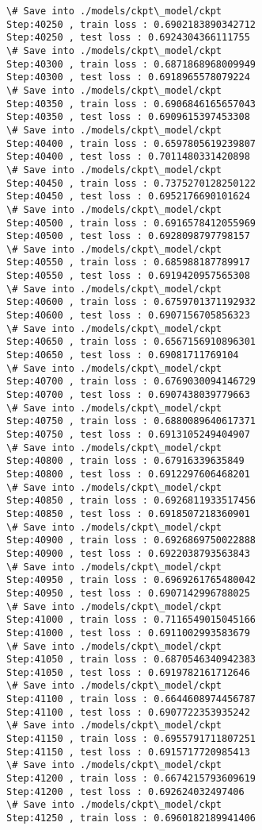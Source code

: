 \documentclass[11pt]{article}
\begin{document}
\begin{Verbatim}[commandchars=\\\{\}]
\# Save into ./models/ckpt\_model/ckpt
Step:40250 , train loss : 0.6902183890342712
Step:40250 , test loss : 0.6924304366111755
\# Save into ./models/ckpt\_model/ckpt
Step:40300 , train loss : 0.6871868968009949
Step:40300 , test loss : 0.6918965578079224
\# Save into ./models/ckpt\_model/ckpt
Step:40350 , train loss : 0.6906846165657043
Step:40350 , test loss : 0.6909615397453308
\# Save into ./models/ckpt\_model/ckpt
Step:40400 , train loss : 0.6597805619239807
Step:40400 , test loss : 0.7011480331420898
\# Save into ./models/ckpt\_model/ckpt
Step:40450 , train loss : 0.7375270128250122
Step:40450 , test loss : 0.6952176690101624
\# Save into ./models/ckpt\_model/ckpt
Step:40500 , train loss : 0.6916578412055969
Step:40500 , test loss : 0.6928098797798157
\# Save into ./models/ckpt\_model/ckpt
Step:40550 , train loss : 0.685988187789917
Step:40550 , test loss : 0.6919420957565308
\# Save into ./models/ckpt\_model/ckpt
Step:40600 , train loss : 0.6759701371192932
Step:40600 , test loss : 0.6907156705856323
\# Save into ./models/ckpt\_model/ckpt
Step:40650 , train loss : 0.6567156910896301
Step:40650 , test loss : 0.69081711769104
\# Save into ./models/ckpt\_model/ckpt
Step:40700 , train loss : 0.6769030094146729
Step:40700 , test loss : 0.6907438039779663
\# Save into ./models/ckpt\_model/ckpt
Step:40750 , train loss : 0.6880089640617371
Step:40750 , test loss : 0.6913105249404907
\# Save into ./models/ckpt\_model/ckpt
Step:40800 , train loss : 0.67916339635849
Step:40800 , test loss : 0.6912297606468201
\# Save into ./models/ckpt\_model/ckpt
Step:40850 , train loss : 0.6926811933517456
Step:40850 , test loss : 0.6918507218360901
\# Save into ./models/ckpt\_model/ckpt
Step:40900 , train loss : 0.6926869750022888
Step:40900 , test loss : 0.6922038793563843
\# Save into ./models/ckpt\_model/ckpt
Step:40950 , train loss : 0.6969261765480042
Step:40950 , test loss : 0.6907142996788025
\# Save into ./models/ckpt\_model/ckpt
Step:41000 , train loss : 0.7116549015045166
Step:41000 , test loss : 0.6911002993583679
\# Save into ./models/ckpt\_model/ckpt
Step:41050 , train loss : 0.6870546340942383
Step:41050 , test loss : 0.6919782161712646
\# Save into ./models/ckpt\_model/ckpt
Step:41100 , train loss : 0.6644608974456787
Step:41100 , test loss : 0.6907722353935242
\# Save into ./models/ckpt\_model/ckpt
Step:41150 , train loss : 0.6955791711807251
Step:41150 , test loss : 0.6915717720985413
\# Save into ./models/ckpt\_model/ckpt
Step:41200 , train loss : 0.6674215793609619
Step:41200 , test loss : 0.692624032497406
\# Save into ./models/ckpt\_model/ckpt
Step:41250 , train loss : 0.6960182189941406

\end{Verbatim}
\end{document}
